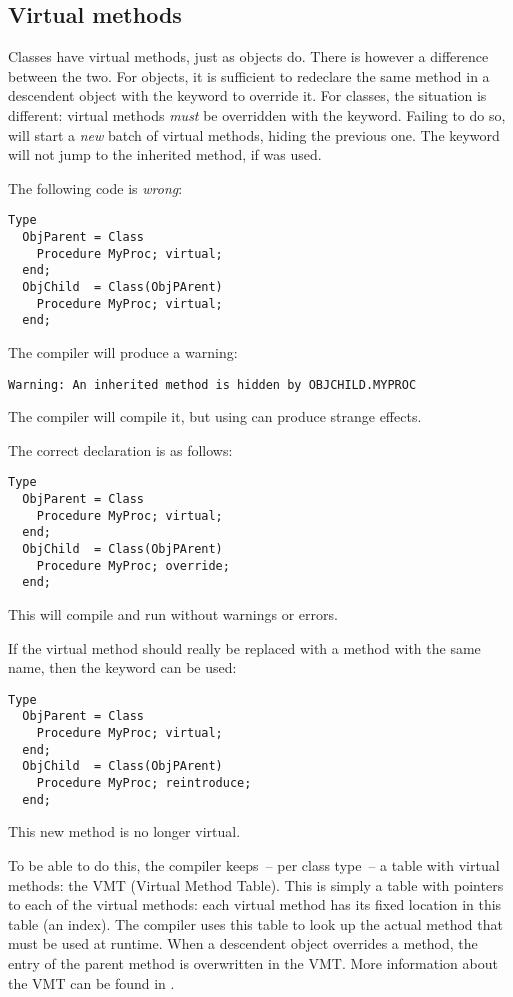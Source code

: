 \subsection{Virtual methods}
Classes have virtual methods, just as objects do. There is however a
difference between the two. For objects, it is sufficient to redeclare the
same method in a descendent object with the keyword  to
override it. For classes, the situation is different: virtual methods
{\em must} be overridden with the  keyword. Failing to do so,
will start a {\em new} batch of virtual methods, hiding the previous
one.  The  keyword will not jump to the inherited method, if
 was used.

The following code is {\em wrong}:
\begin{verbatim}
Type
  ObjParent = Class
    Procedure MyProc; virtual;
  end;
  ObjChild  = Class(ObjPArent)
    Procedure MyProc; virtual;
  end;
\end{verbatim}
The compiler will produce a warning:
\begin{verbatim}
Warning: An inherited method is hidden by OBJCHILD.MYPROC
\end{verbatim}
The compiler will compile it, but using  can
produce strange effects.

The correct declaration is as follows:
\begin{verbatim}
Type
  ObjParent = Class
    Procedure MyProc; virtual;
  end;
  ObjChild  = Class(ObjPArent)
    Procedure MyProc; override;
  end;
\end{verbatim}
This will compile and run without warnings or errors.

If the virtual method should really be replaced with a method with the
same name, then the  keyword can be used:
\begin{verbatim}
Type
  ObjParent = Class
    Procedure MyProc; virtual;
  end;
  ObjChild  = Class(ObjPArent)
    Procedure MyProc; reintroduce;
  end;
\end{verbatim}
This new method is no longer virtual.

To be able to do this, the compiler keeps~-- per class type~-- a table with
virtual methods: the VMT (Virtual Method Table). This is simply a table
with pointers to each of the virtual methods: each virtual method has its
fixed location in this table (an index). The compiler uses this table to
look up the actual method that must be used at runtime. When a descendent object
overrides a method, the entry of the parent method is overwritten in the
VMT. More information about the VMT can be found in \progref.

